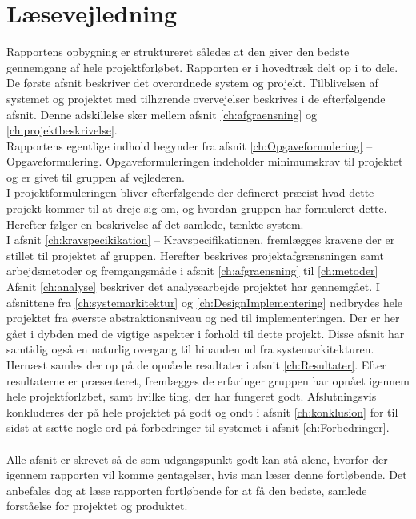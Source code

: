 \section{Læsevejledning}
Rapportens opbygning er struktureret således at den giver den bedste gennemgang af hele projektforløbet. Rapporten er i hovedtræk delt op i to dele. De første afsnit beskriver det overordnede system og projekt. Tilblivelsen af systemet og projektet med tilhørende overvejelser beskrives i de efterfølgende afsnit. Denne adskillelse sker mellem afsnit \ref{ch:afgraensning} og \ref{ch:projektbeskrivelse}.\\
Rapportens egentlige indhold begynder fra afsnit \ref{ch:Opgaveformulering} – Opgaveformulering. Opgaveformuleringen indeholder minimumskrav til projektet og er givet til gruppen af vejlederen.\\
I projektformuleringen bliver efterfølgende der defineret præcist hvad dette projekt kommer til at dreje sig om, og hvordan gruppen har formuleret dette. Herefter følger en beskrivelse af det samlede, tænkte system.\\
I afsnit \ref{ch:kravspecikikation} – Kravspecifikationen, fremlægges kravene der er stillet til projektet af gruppen. Herefter beskrives projektafgrænsningen samt arbejdsmetoder og fremgangsmåde i afsnit \ref{ch:afgraensning} til \ref{ch:metoder}\\
Afsnit \ref{ch:analyse} beskriver det analysearbejde projektet har gennemgået. I afsnittene fra \ref{ch:systemarkitektur} og \ref{ch:DesignImplementering} nedbrydes hele projektet fra øverste abstraktionsniveau og ned til implementeringen. Der er her gået i dybden med de vigtige aspekter i forhold til dette projekt. Disse afsnit har samtidig også en naturlig overgang til hinanden ud fra systemarkitekturen. \\
Hernæst samles der op på de opnåede resultater i afsnit \ref{ch:Resultater}. Efter resultaterne er præsenteret, fremlægges de erfaringer gruppen har opnået igennem hele projektforløbet, samt hvilke ting, der har fungeret godt. Afslutningsvis konkluderes der på hele projektet på godt og ondt i afsnit \ref{ch:konklusion} for til sidst at sætte nogle ord på forbedringer til systemet i afsnit \ref{ch:Forbedringer}. \\\\
Alle afsnit er skrevet så de som udgangspunkt godt kan stå alene, hvorfor der igennem rapporten vil komme gentagelser, hvis man læser denne fortløbende. Det anbefales dog at læse rapporten fortløbende for at få den bedste, samlede forståelse for projektet og produktet.\\

